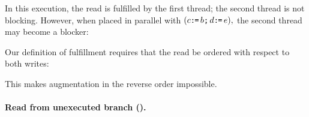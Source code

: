 In this execution, the read is fulfilled by the first thread; the second
thread is not blocking.  However, when placed in parallel with
\begin{math}
  (c\texttt{:}\mkern-1mu\texttt{=}\, b\texttt{;}\,\allowbreak d\texttt{:}\mkern-1mu\texttt{=}\, e),
\end{math}
the second thread may become a blocker:
\begin{tikzdisplay}[node distance=1em]
\end{tikzdisplay}

Our definition of fulfillment requires that the read be ordered with respect
to both writes:
\begin{tikzdisplay}[node distance=1em]
\end{tikzdisplay}
This makes augmentation in the reverse order impossible.



\paragraph{Read from unexecuted branch (\rfub).}
\begin{comment}
RFUB Example 1
Thread 1:	                        
r1 = x.load(memory_order_relaxed);
y.store(r1, memory_order_relaxed);	

Thread 2:
bool assigned_42(false);
r1 = y.load(memory_order_relaxed);
if (r1 != 42) {
    assigned_42 = true;
    r1 = 42;
}
x.store(r1, memory_order_relaxed);
assert_not(assigned_42);
\end{comment}

